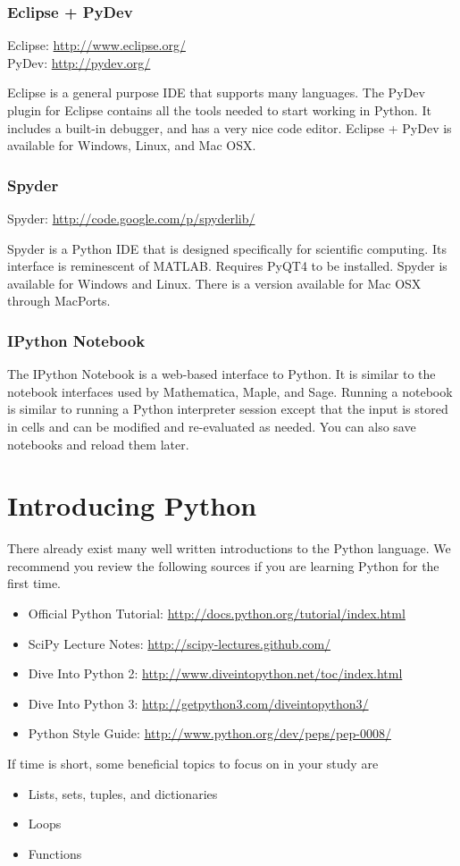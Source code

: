 \subsubsection*{Eclipse + PyDev}

Eclipse: \url{http://www.eclipse.org/} \\
PyDev: \url{http://pydev.org/}

Eclipse is a general purpose IDE that supports many languages.  
The PyDev plugin for Eclipse contains all the tools needed to start working in Python.
It includes a built-in debugger, and has a very nice code editor. 
Eclipse + PyDev is available for Windows, Linux, and Mac OSX.

\subsubsection*{Spyder}

Spyder: \url{http://code.google.com/p/spyderlib/}

Spyder is a Python IDE that is designed specifically for scientific computing. 
Its interface is reminescent of MATLAB. 
Requires PyQT4 to be installed. 
Spyder is available for Windows and Linux.  
There is a version available for Mac OSX through MacPorts.

\subsubsection*{IPython Notebook}
The IPython Notebook is a web-based interface to Python.
It is similar to the notebook interfaces used by Mathematica, Maple, and Sage.
Running a notebook is similar to running a Python interpreter session except that the input is stored in cells and can be modified and re-evaluated as needed.
You can also save notebooks and reload them later.

\section*{Introducing Python}
There already exist many well written introductions to the Python language. 
We recommend you review the following sources if you are learning Python for the first time.

\begin{itemize}
\item Official Python Tutorial: \url{http://docs.python.org/tutorial/index.html}
\item SciPy Lecture Notes: \url{http://scipy-lectures.github.com/}
\item Dive Into Python 2: \url{http://www.diveintopython.net/toc/index.html}
\item Dive Into Python 3: \url{http://getpython3.com/diveintopython3/}
\item Python Style Guide: \url{http://www.python.org/dev/peps/pep-0008/}
\end{itemize}
If time is short, some beneficial topics to focus on in your study are
\begin{itemize}
\item Lists, sets, tuples, and dictionaries
\item Loops
\item Functions
\end{itemize}

